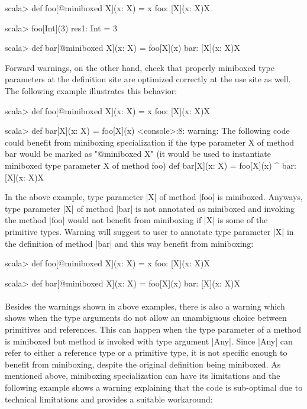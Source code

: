 \begin{lstlisting-nobreak}
scala> def foo[@miniboxed X](x: X) = x
foo: [X](x: X)X

scala> foo[Int](3)
res1: Int = 3

scala> def bar[@miniboxed X](x: X) = foo[X](x)
bar: [X](x: X)X
\end{lstlisting-nobreak}
Forward warnings, on the other hand, check that properly miniboxed type parameters at the definition site are optimized correctly at the use site as well. The following example illustrates this behavior:

\begin{lstlisting-nobreak}
scala> def foo[@miniboxed X](x: X) = x
foo: [X](x: X)X

scala> def bar[X](x: X) = foo[X](x)
<console>:8: warning: The following code could benefit from miniboxing specialization if the type parameter X of method bar would be marked as "@miniboxed X" (it would be used to instantiate miniboxed type parameter X of method foo)
       def bar[X](x: X) = foo[X](x)
                             ^
bar: [X](x: X)X
\end{lstlisting-nobreak}
In the above example, type parameter |X| of method |foo| is miniboxed. Anyways, type parameter |X| of method |bar| is not annotated as miniboxed and invoking the method |foo| would not benefit from miniboxing if |X| is some of the primitive types. Warning will suggest to user to annotate type parameter |X| in the definition of method |bar| and this way benefit from miniboxing:

\begin{lstlisting-nobreak}
scala> def foo[@miniboxed X](x: X) = x
foo: [X](x: X)X

scala> def bar[@miniboxed X](x: X) = foo[X](x)
bar: [X](x: X)X
\end{lstlisting-nobreak}

\paragraph{}
Besides the warnings shown in above examples, there is also a warning which shows when the type arguments do not allow an unambiguous choice between primitives and references. This can happen when the type parameter of a method is miniboxed but method is invoked with type argument |Any|. Since |Any| can refer to either a reference type or a primitive type, it is not specific enough to benefit from miniboxing, despite the original definition being miniboxed. As mentioned above, miniboxing specialization can have its limitations and the following example shows a warning explaining that the code is sub-optimal due to technical limitations and provides a suitable workaround:


